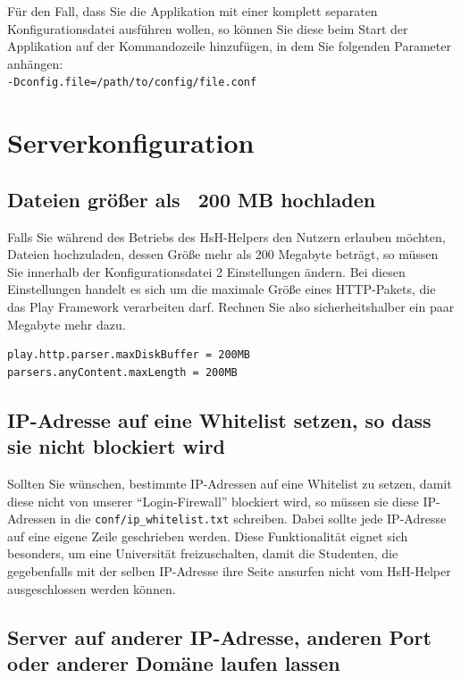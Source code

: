 \documentclass[12pt,DIV14,BCOR10mm,a4paper,parskip=half-,headsepline,headinclude,english,ngerman,bibliography=totocnumbered]{scrreprt}
\begin{document}
Für den Fall, dass Sie die Applikation mit einer komplett separaten Konfigurationsdatei ausführen wollen, so können Sie diese beim Start der Applikation auf der Kommandozeile hinzufügen, in dem Sie folgenden Parameter anhängen: \\
\texttt{-Dconfig.file=/path/to/config/file.conf}

\section{Serverkonfiguration}

\subsection{Dateien größer als ~200 MB hochladen}

Falls Sie während des Betriebs des HsH-Helpers den Nutzern erlauben möchten, Dateien hochzuladen, dessen Größe mehr als 200 Megabyte beträgt, so müssen Sie innerhalb der Konfigurationsdatei 2 Einstellungen ändern.
Bei diesen Einstellungen handelt es sich um die maximale Größe eines HTTP-Pakets, die das Play Framework verarbeiten darf.
Rechnen Sie also sicherheitshalber ein paar Megabyte mehr dazu.

\begin{lstlisting}[label=server-max-file-upload, caption={"Dateigröße und HTTP-Paketgröße"-Einstellung innerhalb der Konfigurationsdatei}, captionpos=b]
play.http.parser.maxDiskBuffer = 200MB
parsers.anyContent.maxLength = 200MB
\end{lstlisting}

\subsection{IP-Adresse auf eine Whitelist setzen, so dass sie nicht blockiert wird}

Sollten Sie wünschen, bestimmte IP-Adressen auf eine Whitelist zu setzen, damit diese nicht von unserer \enquote{Login-Firewall} blockiert wird, so müssen sie diese IP-Adressen in die \texttt{conf/ip\_whitelist.txt} schreiben.
Dabei sollte jede IP-Adresse auf eine eigene Zeile geschrieben werden.
Diese Funktionalität eignet sich besonders, um eine Universität freizuschalten, damit die Studenten, die gegebenfalls mit der selben IP-Adresse ihre Seite ansurfen nicht vom HsH-Helper ausgeschlossen werden können.

\subsection{Server auf anderer IP-Adresse, anderen Port oder anderer Domäne laufen lassen}
\end{document}
